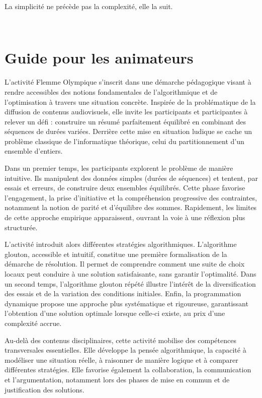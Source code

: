 \documentclass[a4paper,twoside]{article}
\begin{document}
\begin{epigramme}
  La simplicité ne précède pas la complexité, elle la suit.
\end{epigramme}

\clearpage
\ifleaflet
  \thispagestyle{empty}
  ~
  \cleardoublepage
\fi
\appendix

\section{Guide pour les animateurs}

L'activité Flemme Olympique s'inscrit dans une démarche pédagogique visant à rendre accessibles des notions fondamentales de l'algorithmique et de l'optimisation à travers une situation concrète. Inspirée de la problématique de la diffusion de contenus audiovisuels, elle invite les participants et participantes à relever un défi : construire un résumé parfaitement équilibré en combinant des séquences de durées variées. Derrière cette mise en situation ludique se cache un problème classique de l'informatique théorique, celui du partitionnement d'un ensemble d'entiers.

Dans un premier temps, les participants explorent le problème de manière intuitive. Ils manipulent des données simples (durées de séquences) et tentent, par essais et erreurs, de construire deux ensembles équilibrés. Cette phase favorise l'engagement, la prise d'initiative et la compréhension progressive des contraintes, notamment la notion de parité et d'équilibre des sommes. Rapidement, les limites de cette approche empirique apparaissent, ouvrant la voie à une réflexion plus structurée.

L'activité introduit alors différentes stratégies algorithmiques. L'algorithme glouton, accessible et intuitif, constitue une première formalisation de la démarche de résolution. Il permet de comprendre comment une suite de choix locaux peut conduire à une solution satisfaisante, sans garantir l'optimalité. Dans un second temps, l'algorithme glouton répété illustre l'intérêt de la diversification des essais et de la variation des conditions initiales. Enfin, la programmation dynamique propose une approche plus systématique et rigoureuse, garantissant l'obtention d'une solution optimale lorsque celle-ci existe, au prix d'une complexité accrue.

Au-delà des contenus disciplinaires, cette activité mobilise des compétences transversales essentielles. Elle développe la pensée algorithmique, la capacité à modéliser une situation réelle, à raisonner de manière logique et à comparer différentes stratégies. Elle favorise également la collaboration, la communication et l'argumentation, notamment lors des phases de mise en commun et de justification des solutions.
\end{document}
